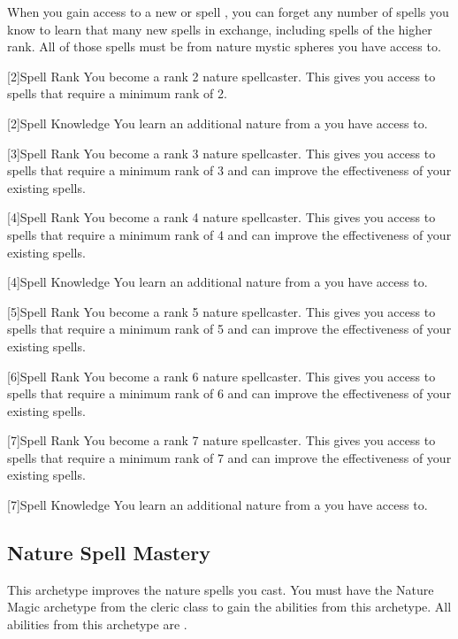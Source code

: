         When you gain access to a new  or spell ,
            you can forget any number of spells you know to learn that many new spells in exchange,
            including spells of the higher rank.
        All of those spells must be from nature mystic spheres you have access to.

        [2]{Spell Rank} You become a rank 2 nature spellcaster.
        This gives you access to spells that require a minimum rank of 2.

        [2]{Spell Knowledge} You learn an additional nature  from a  you have access to.

        [3]{Spell Rank} You become a rank 3 nature spellcaster.
        This gives you access to spells that require a minimum rank of 3 and can improve the effectiveness of your existing spells.

        [4]{Spell Rank} You become a rank 4 nature spellcaster.
        This gives you access to spells that require a minimum rank of 4 and can improve the effectiveness of your existing spells.

        [4]{Spell Knowledge} You learn an additional nature  from a  you have access to.

        [5]{Spell Rank} You become a rank 5 nature spellcaster.
        This gives you access to spells that require a minimum rank of 5 and can improve the effectiveness of your existing spells.

        [6]{Spell Rank} You become a rank 6 nature spellcaster.
        This gives you access to spells that require a minimum rank of 6 and can improve the effectiveness of your existing spells.

        [7]{Spell Rank} You become a rank 7 nature spellcaster.
        This gives you access to spells that require a minimum rank of 7 and can improve the effectiveness of your existing spells.

        [7]{Spell Knowledge} You learn an additional nature  from a  you have access to.

    \newpage
    \subsection{Nature Spell Mastery}
        This archetype improves the nature spells you cast.
        You must have the Nature Magic archetype from the cleric class to gain the abilities from this archetype.
        All abilities from this archetype are .

